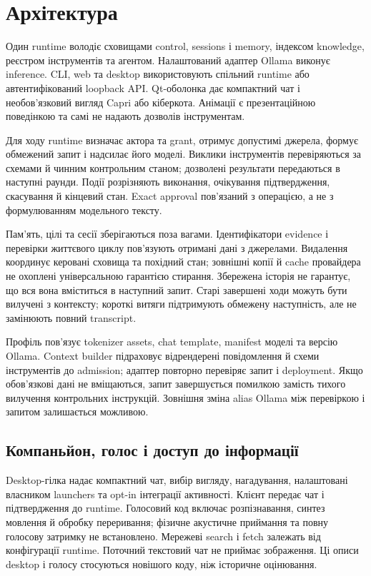 \documentclass[11pt]{article}
\begin{document}
\section{Архітектура}
Один runtime володіє сховищами control, sessions і memory, індексом knowledge, реєстром інструментів та агентом. Налаштований адаптер Ollama виконує inference. CLI, web та desktop використовують спільний runtime або автентифікований loopback API. Qt-оболонка дає компактний чат і необов'язковий вигляд Capri або кіберкота. Анімації є презентаційною поведінкою та самі не надають дозволів інструментам.

Для ходу runtime визначає актора та grant, отримує допустимі джерела, формує обмежений запит і надсилає його моделі. Виклики інструментів перевіряються за схемами й чинним контрольним станом; дозволені результати передаються в наступні раунди. Події розрізняють виконання, очікування підтвердження, скасування й кінцевий стан. Exact approval пов'язаний з операцією, а не з формулюванням модельного тексту.

Пам'ять, цілі та сесії зберігаються поза вагами. Ідентифікатори evidence і перевірки життєвого циклу пов'язують отримані дані з джерелами. Видалення координує керовані сховища та похідний стан; зовнішні копії й cache провайдера не охоплені універсальною гарантією стирання. Збережена історія не гарантує, що вся вона вміститься в наступний запит. Старі завершені ходи можуть бути вилучені з контексту; короткі витяги підтримують обмежену наступність, але не замінюють повний transcript.

Профіль пов'язує tokenizer assets, chat template, manifest моделі та версію Ollama. Context builder підраховує відрендерені повідомлення й схеми інструментів до admission; адаптер повторно перевіряє запит і deployment. Якщо обов'язкові дані не вміщаються, запит завершується помилкою замість тихого вилучення контрольних інструкцій. Зовнішня зміна alias Ollama між перевіркою і запитом залишається можливою.

\subsection{Компаньйон, голос і доступ до інформації}
Desktop-гілка надає компактний чат, вибір вигляду, нагадування, налаштовані власником launchers та opt-in інтеграції активності. Клієнт передає чат і підтвердження до runtime. Голосовий код включає розпізнавання, синтез мовлення й обробку переривання; фізичне акустичне приймання та повну голосову затримку не встановлено. Мережеві search і fetch залежать від конфігурації runtime. Поточний текстовий чат не приймає зображення. Ці описи desktop і голосу стосуються новішого коду, ніж історичне оцінювання.
\end{document}
